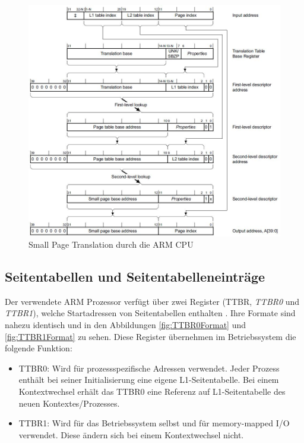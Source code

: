 \begin{figure}[H]
	\includegraphics[scale=0.8]{figures/smallPageTranslation}
	\caption{Small Page Translation durch die ARM CPU \cite[S. B3-1337]{ARM:ARM}}
	\label{fig:smallPageTranslation}
\end{figure}

\subsection{Seitentabellen und Seitentabelleneinträge}
\label{subsect:pageTables}

Der verwendete ARM Prozessor verfügt über zwei Register (\acf{TTBR}, \emph{TTBR0} und \emph{TTBR1}), welche Startadressen von Seitentabellen enthalten  \cite[S. B3-1320]{ARM:ARM}. Ihre Formate sind nahezu identisch und in den Abbildungen \ref{fig:TTBR0Format} und \ref{fig:TTBR1Format} zu sehen. Diese Register übernehmen im Betriebssystem die folgende Funktion:

\begin{itemize}
	\item TTBR0: Wird für prozessspezifische Adressen verwendet. Jeder Prozess enthält bei seiner Initialisierung eine eigene L1-Seitentabelle. Bei einem Kontextwechsel erhält das TTBR0 eine Referenz auf L1-Seitentabelle des neuen Kontextes/Prozesses.
	\item TTBR1: Wird für das Betriebssystem selbst und für memory-mapped I/O verwendet. Diese ändern sich bei einem Kontextwechsel nicht.
\end{itemize}


